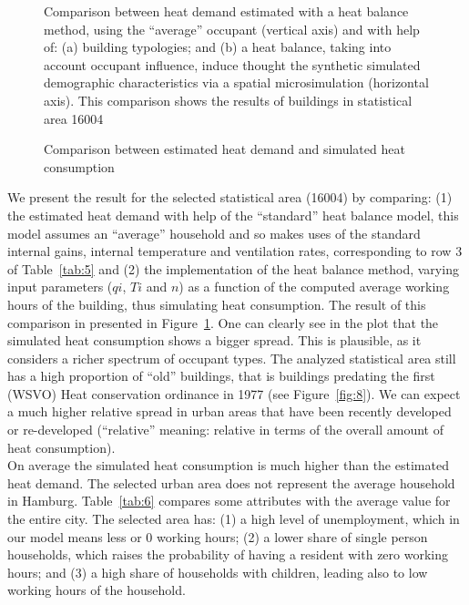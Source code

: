 \documentclass[11pt]{IJM-article}
\begin{document}
\begin{figure}[htb] 
    \centering 
    \caption{Comparison between estimated heat demand and simulated heat
    consumption}
    
    \label{fig:7}
    \begin{flushleft}
    \begin{footnotesize}
        Comparison between heat demand estimated with a heat balance method,
        using the ``average'' occupant (vertical axis) and with help of: (a)
        building typologies; and (b) a heat balance, taking into account
        occupant influence, induce thought the synthetic simulated demographic
        characteristics via a spatial microsimulation (horizontal axis). This
        comparison shows the results of buildings in statistical area 16004
    \end{footnotesize}
    \end{flushleft}
\end{figure}

We present the result for the selected statistical area (16004) by comparing:
(1) the estimated heat demand with help of the ``standard'' heat balance model,
this model assumes an ``average'' household and so makes uses of the standard
internal gains, internal temperature and ventilation rates, corresponding to
row 3 of Table~\ref{tab:5} and (2) the implementation of the heat balance
method, varying input parameters ($qi$, $Ti$ and $n$) as a function of the
computed average working hours of the building, thus simulating heat
consumption. The result of this comparison in presented in Figure~\ref{fig:7}.
One can clearly see in the plot that the simulated heat consumption shows a
bigger spread. This is plausible, as it considers a richer spectrum of occupant
types. The analyzed statistical area still has a high proportion of ``old''
buildings, that is buildings predating the first (WSVO) Heat conservation
ordinance in 1977 (see Figure~\ref{fig:8}). We can expect a much higher
relative spread in urban areas that have been recently developed or
re-developed (``relative'' meaning: relative in terms of the overall amount of
heat consumption).\\

On average the simulated heat consumption is much higher than the estimated
heat demand. The selected urban area does not represent the average household
in Hamburg.  Table~\ref{tab:6} compares some attributes with the average value
for the entire city. The selected area has: (1) a high level of unemployment,
which in our model means less or 0 working hours; (2) a lower share of single
person households, which raises the probability of having a resident with zero
working hours; and (3) a high share of households with children, leading also
to low working hours of the household.\\
\end{document}
